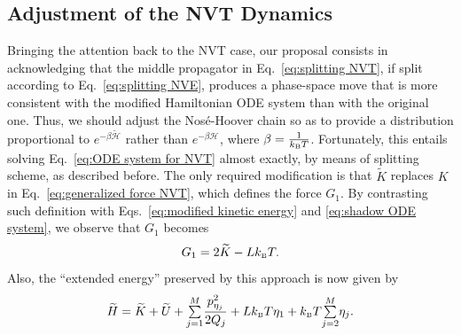 \documentclass[
journal=jctcce,
layout=twocolumn
]{achemso}
\newcommand{\Ham}[1]{{\mathcal H}_\text{#1}}    %
\newcommand{\modified}[1]{\widetilde{#1}}
\begin{document}
\subsection{Adjustment of the NVT Dynamics}
\label{sec:refined_method}
Bringing the attention back to the NVT case, our proposal consists in acknowledging that the middle propagator in Eq.~\eqref{eq:splitting NVT}, if split according to Eq.~\eqref{eq:splitting NVE}, produces a phase-space move that is more consistent with the modified Hamiltonian ODE system than with the original one.
Thus, we should adjust the Nos\'e-Hoover chain so as to provide a distribution proportional to $e^{-\beta \modified{\Ham{}}}$ rather than $e^{-\beta \Ham{}}$, where $\beta = \frac{1}{k_\text{\tiny B} T}$.
Fortunately, this entails solving Eq.~\eqref{eq:ODE system for NVT} almost exactly, by means of splitting scheme, as described before.
The only required modification is that $\modified K$ replaces $K$ in Eq.~\eqref{eq:generalized force NVT}, which defines the force $G_1$.
By contrasting such definition with Eqs.~\eqref{eq:modified kinetic energy} and \eqref{eq:shadow ODE system}, we observe that $G_1$ becomes
\begin{equation}
\label{eq:thermostat_force}
G_1 = 2 \modified K - L k_\text{\tiny B} T.
\end{equation}
Also, the ``extended energy'' preserved by this approach is now given by
\begin{equation}
\label{eq:this extended energy}
\widetilde{H} = \modified K + \modified U + {\textstyle\sum\limits_{j=1}^{M}} \frac{p_{\eta_j}^2}{2Q_j} + L k_\text{\tiny B} T\eta_1 + k_\text{\tiny B} T {\textstyle\sum\limits_{j=2}^{M}} \eta_j.
\end{equation}
\end{document}
